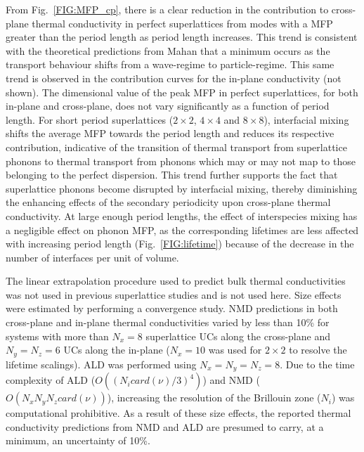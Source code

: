 \documentclass[aps,prb,preprint,preprintnumbers,amsmath,amssymb,floatfix,superscriptaddress]{revtex4}
\begin{document}
From Fig.~\ref{FIG:MFP_cp}, there is a clear reduction in the contribution to cross-plane thermal conductivity in perfect superlattices from modes with a MFP greater than the period length as period length increases. This trend is consistent with the theoretical predictions from Mahan that a minimum occurs as the transport behaviour shifts from a wave-regime to particle-regime.\cite{PhysRevLett.84.927,PhysRevB.56.10754} This same trend is observed in the contribution curves for the in-plane conductivity (not shown). The dimensional value of the peak MFP in perfect superlattices, for both in-plane and cross-plane, does not vary significantly as a function of period length. For short period superlattices ($2\times2$, $4\times4$ and $8\times8$), interfacial mixing shifts the average MFP towards the period length and reduces its respective contribution, indicative of the transition of thermal transport from superlattice phonons to thermal transport from phonons which may or may not map to those belonging to the perfect dispersion. This trend further supports the fact that superlattice phonons become disrupted by interfacial mixing, thereby diminishing the enhancing effects of the secondary periodicity upon cross-plane thermal conductivity. At large enough period lengths, the effect of interspecies mixing has a negligible effect on phonon MFP, as the corresponding lifetimes are less affected with increasing period length (Fig.~\ref{FIG:lifetime}) because of the decrease in the number of interfaces per unit of volume. \cite{PhysRevB.79.075316}

The linear extrapolation procedure used to predict bulk thermal conductivities \cite{PhysRevB.81.214305} was not used in previous superlattice studies \cite{doi:10.1021/nl202186y,Luckyanova16112012} and is not used here. Size effects were estimated by performing a convergence study. NMD predictions in both cross-plane and in-plane thermal conductivities varied by less than 10\% for systems with more than $N_x=8$ superlattice UCs along the cross-plane and $N_y=N_z=6$ UCs along the in-plane ($N_x=10$ was used for $2\times2$ to resolve the lifetime scalings). ALD was performed using $N_x=N_y=N_z=8$. Due to the time complexity of ALD ($O((N_i card(\nu)/3)^4)$) and NMD ($O(N_x  N_y N_z card(\nu))$), increasing the resolution of the Brillouin zone ($N_i$) was computational prohibitive. As a result of these size effects, the reported thermal conductivity predictions from NMD and ALD are presumed to carry, at a minimum, an uncertainty of 10\%.
\end{document}
